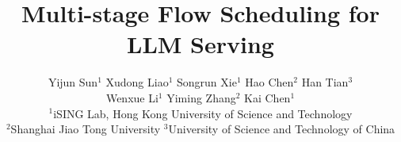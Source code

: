 \documentclass[sigconf]{acmart}
\begin{document}
\pagestyle{plain}

\title{Multi-stage Flow Scheduling for LLM Serving}

\author{
  Yijun Sun$^{1}$ \quad
  Xudong Liao$^{1}$ \quad
  Songrun Xie$^{1}$ \quad
  Hao Chen$^{2}$ \quad
  Han Tian$^{3}$ \\
  Wenxue Li$^{1}$ \quad
  Yiming Zhang$^{2}$ \quad
  Kai Chen$^{1}$ \\
  \vspace{0.2cm}
  $^{1}$iSING Lab, Hong Kong University of Science and Technology \\
  $^{2}$Shanghai Jiao Tong University \quad
  $^{3}$University of Science and Technology of China \\
  \vspace{0.1cm}
}

\renewcommand{\shortauthors}{Sun et al.}

\begin{abstract}

\end{abstract}

\maketitle










\normalem





\end{document}
